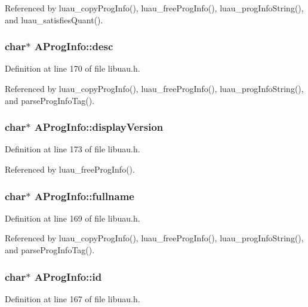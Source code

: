 Referenced by luau\_\-copy\-Prog\-Info(), luau\_\-free\-Prog\-Info(), luau\_\-prog\-Info\-String(), and luau\_\-satisfies\-Quant().
\subsubsection{\setlength{\rightskip}{0pt plus 5cm}char$\ast$ {\bf AProg\-Info::desc}}\label{structAProgInfo_o3}




Definition at line 170 of file libuau.h.

Referenced by luau\_\-copy\-Prog\-Info(), luau\_\-free\-Prog\-Info(), luau\_\-prog\-Info\-String(), and parse\-Prog\-Info\-Tag().
\subsubsection{\setlength{\rightskip}{0pt plus 5cm}char$\ast$ {\bf AProg\-Info::display\-Version}}\label{structAProgInfo_o6}




Definition at line 173 of file libuau.h.

Referenced by luau\_\-free\-Prog\-Info().
\subsubsection{\setlength{\rightskip}{0pt plus 5cm}char$\ast$ {\bf AProg\-Info::fullname}}\label{structAProgInfo_o2}




Definition at line 169 of file libuau.h.

Referenced by luau\_\-copy\-Prog\-Info(), luau\_\-free\-Prog\-Info(), luau\_\-prog\-Info\-String(), and parse\-Prog\-Info\-Tag().
\subsubsection{\setlength{\rightskip}{0pt plus 5cm}char$\ast$ {\bf AProg\-Info::id}}\label{structAProgInfo_o0}




Definition at line 167 of file libuau.h.

